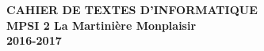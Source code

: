 \documentclass[12pt,a4paper]{article}
\begin{document}
\begin{center}
\Large\bf CAHIER DE TEXTES D'INFORMATIQUE\\
MPSI 2 La Martinière Monplaisir\\ 2016-2017
\end{center}
\vspace{1cm}
\vspace{.4cm}\\

% 
% 
%  
%  
% 
% 
% 
% 
%  
\end{document}

